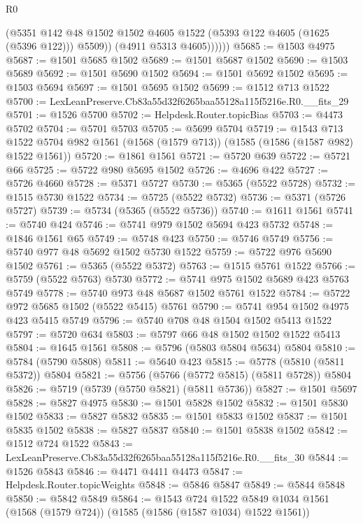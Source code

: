 \begin{lexlean}{R0}
\begin{coremodule}
                (@5351
                  @142
                  @48
                  @1502
                  @1502
                  @4605
                  @1522
                  (@5393 @122 @4605 (@1625 (@5396 @122)))
                  @5509))
              (@4911 @5313 @4605))))))
@5685 := @1503 @4975
@5687 := @1501 @5685 @1502
@5689 := @1501 @5687 @1502
@5690 := @1503 @5689
@5692 := @1501 @5690 @1502
@5694 := @1501 @5692 @1502
@5695 := @1503 @5694
@5697 := @1501 @5695 @1502
@5699 := @1512 @713 @1522
@5700 := LexLeanPreserve.Cb83a55d32f6265baa55128a115f5216e.R0.__fits_29
@5701 := @1526 @5700
@5702 := Helpdesk.Router.topicBias
@5703 := @4473 @5702
@5704 := @5701 @5703
@5705 := @5699 @5704
@5719 := @1543
    @713
    @1522
    @5704
    @982
    @1561
    (@1568 (@1579 @713))
    (@1585 (@1586 (@1587 @982) @1522 @1561))
@5720 := @1861 @1561
@5721 := @5720 @639
@5722 := @5721 @66
@5725 := @5722 @980 @5695 @1502
@5726 := @4696 @422
@5727 := @5726 @4660
@5728 := @5371 @5727
@5730 := @5365 (@5522 @5728)
@5732 := @1515 @5730 @1522
@5734 := @5725 (@5522 @5732)
@5736 := @5371 (@5726 @5727)
@5739 := @5734 (@5365 (@5522 @5736))
@5740 := @1611 @1561
@5741 := @5740 @424
@5746 := @5741 @979 @1502 @5694 @423 @5732
@5748 := @1846 @1561 @65
@5749 := @5748 @423
@5750 := @5746 @5749
@5756 := @5740 @977 @48 @5692 @1502 @5730 @1522
@5759 := @5722 @976 @5690 @1502
@5761 := @5365 (@5522 @5372)
@5763 := @1515 @5761 @1522
@5766 := @5759 (@5522 @5763) @5730
@5772 := @5741 @975 @1502 @5689 @423 @5763 @5749
@5778 := @5740 @973 @48 @5687 @1502 @5761 @1522
@5784 := @5722 @972 @5685 @1502 (@5522 @5415) @5761
@5790 := @5741 @954 @1502 @4975 @423 @5415 @5749
@5796 := @5740 @708 @48 @1504 @1502 @5413 @1522
@5797 := @5720 @634
@5803 := @5797 @66 @48 @1502 @1502 @1522 @5413
@5804 := @1645 @1561
@5808 := @5796 (@5803 @5804 @5634) @5804
@5810 := @5784 (@5790 @5808)
@5811 := @5640 @423
@5815 := @5778 (@5810 (@5811 @5372)) @5804
@5821 := @5756 (@5766 (@5772 @5815) (@5811 @5728)) @5804
@5826 := @5719 (@5739 (@5750 @5821) (@5811 @5736))
@5827 := @1501 @5697
@5828 := @5827 @4975
@5830 := @1501 @5828 @1502
@5832 := @1501 @5830 @1502
@5833 := @5827 @5832
@5835 := @1501 @5833 @1502
@5837 := @1501 @5835 @1502
@5838 := @5827 @5837
@5840 := @1501 @5838 @1502
@5842 := @1512 @724 @1522
@5843 := LexLeanPreserve.Cb83a55d32f6265baa55128a115f5216e.R0.__fits_30
@5844 := @1526 @5843
@5846 := @4471 @4411 @4473
@5847 := Helpdesk.Router.topicWeights
@5848 := @5846 @5847
@5849 := @5844 @5848
@5850 := @5842 @5849
@5864 := @1543
    @724
    @1522
    @5849
    @1034
    @1561
    (@1568 (@1579 @724))
    (@1585 (@1586 (@1587 @1034) @1522 @1561))

\end{coremodule}
\end{lexlean}
